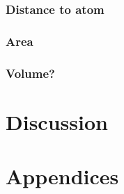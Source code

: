\documentclass[twoside,english,a4paper]{uiofysmaster}
\begin{document}
    \section{Distance to atom}
    \section{Area}
    \section{Volume?}

\part{Discussion}

\part{Appendices}

\printbibliography
% 
\end{document}
